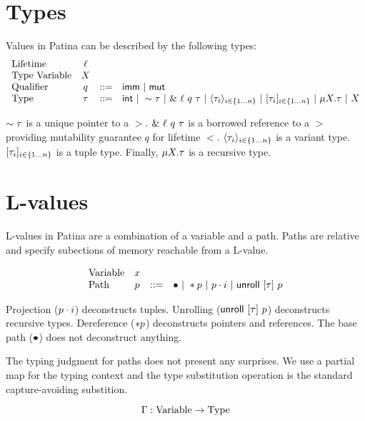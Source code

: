 \section*{Types}

Values in Patina can be described by the following types:
\[
\begin{array}{lccl}
\textrm{Lifetime} & \ell & & \\
\textrm{Type Variable} & X & & \\
\textrm{Qualifier} & q & ::= & \mathsf{imm} ~|~ \mathsf{mut} \\
\textrm{Type} & \tau & ::= & \mathsf{int} ~|~ \sim{\tau} ~|~ \&~{{\ell}~{q}~{\tau}} ~|~ 
				\langle{{\tau}_{i}}\rangle_{{i} \in \{1 \ldots {n}\} } ~|~ [{{\tau}_{i}}]_{{i} \in \{1 \ldots {n}\} } ~|~ 
				\mu {X}.{\tau} ~|~ X \\
\end{array}
\]

$\sim{\tau}$ is a unique pointer to a $\gt$.
$\&~{{\ell}~{q}~{\tau}}$ is a borrowed reference to a $\gt$
providing mutability guarantee $q$ for lifetime $\lt$.
$\langle{{\tau}_{i}}\rangle_{{i} \in \{1 \ldots {n}\} }$ is a variant type.
$[{{\tau}_{i}}]_{{i} \in \{1 \ldots {n}\} }$ is a tuple type.
Finally, $\mu {X}.{\tau}$ is a recursive type.

\section*{L-values}

L-values in Patina are a combination of a variable and a path.
Paths are relative and specify subections of memory reachable from a L-value.

\[
\begin{array}{lccl}
\textrm{Variable} & x & & \\
\textrm{Path} & p & ::= & \bullet ~|~ *{p} ~|~ {p}\cdot{i} ~|~ \mathsf{unroll}~[{\tau}]~{p} \\
\end{array}
\]

Projection (${p}\cdot{i}$) deconstructs tuples.
Unrolling ($\mathsf{unroll}~[{\tau}]~{p}$) deconstructs recursive types.
Dereference ($*{p}$) deconstructs pointers and references.
The base path ($\bullet$) does not deconstruct anything.

The typing judgment for paths does not present any surprises.
We use a partial map for the typing context and
the type substitution operation is the standard capture-avoiding substition.

$$ \Gamma : \mathrm{Variable} \to \mathrm{Type} $$


